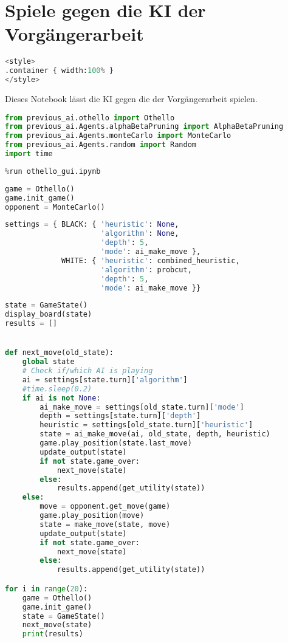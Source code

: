 \hypertarget{spiele-gegen-die-ki-der-vorguxe4ngerarbeit}{%
\section{Spiele gegen die KI der
Vorgängerarbeit}\label{spiele-gegen-die-ki-der-vorguxe4ngerarbeit}}

\label{sec:aivsprevious}

\begin{lstlisting}[language=Python]
%%HTML
<style>
.container { width:100% }
</style>
\end{lstlisting}

Dieses Notebook lässt die KI gegen die der Vorgängerarbeit spielen.

\begin{lstlisting}[language=Python]
from previous_ai.othello import Othello
from previous_ai.Agents.alphaBetaPruning import AlphaBetaPruning
from previous_ai.Agents.monteCarlo import MonteCarlo
from previous_ai.Agents.random import Random
import time
\end{lstlisting}

\begin{lstlisting}[language=Python]
%run othello_ai.ipynb
%run othello_gui.ipynb
\end{lstlisting}

\begin{lstlisting}[language=Python]
game = Othello()
game.init_game()
opponent = MonteCarlo()
\end{lstlisting}

\begin{lstlisting}[language=Python]
settings = { BLACK: { 'heuristic': None,
                      'algorithm': None,
                      'depth': 5,
                      'mode': ai_make_move },
             WHITE: { 'heuristic': combined_heuristic,
                      'algorithm': probcut,
                      'depth': 5,
                      'mode': ai_make_move }}
\end{lstlisting}

\begin{lstlisting}[language=Python]
state = GameState()
display_board(state)
results = []


def next_move(old_state):
    global state
    # Check if/which AI is playing
    ai = settings[state.turn]['algorithm']
    #time.sleep(0.2)
    if ai is not None:
        ai_make_move = settings[old_state.turn]['mode']
        depth = settings[state.turn]['depth']
        heuristic = settings[old_state.turn]['heuristic']
        state = ai_make_move(ai, old_state, depth, heuristic)
        game.play_position(state.last_move)
        update_output(state)
        if not state.game_over:
            next_move(state)
        else:
            results.append(get_utility(state))
    else:
        move = opponent.get_move(game)
        game.play_position(move)
        state = make_move(state, move)
        update_output(state)
        if not state.game_over:
            next_move(state)
        else:
            results.append(get_utility(state))

for i in range(20):
    game = Othello()
    game.init_game()
    state = GameState()
    next_move(state)
    print(results)
\end{lstlisting}
